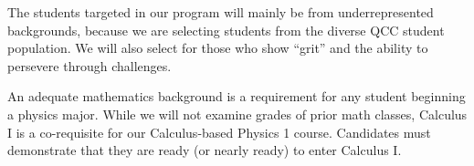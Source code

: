 \documentclass[12pt]{article}
\begin{document}
The students targeted in our program will mainly be from underrepresented backgrounds, because we are selecting students from the diverse QCC  student population.  We will also select for those who show ``grit'' and the ability to persevere through challenges.  

An adequate mathematics background is a requirement for any student beginning a physics major.  While we will not examine grades of prior math classes, Calculus I is a co-requisite for our Calculus-based Physics 1 course.  Candidates must demonstrate that they are ready (or nearly ready) to enter Calculus I.





\end{document}
